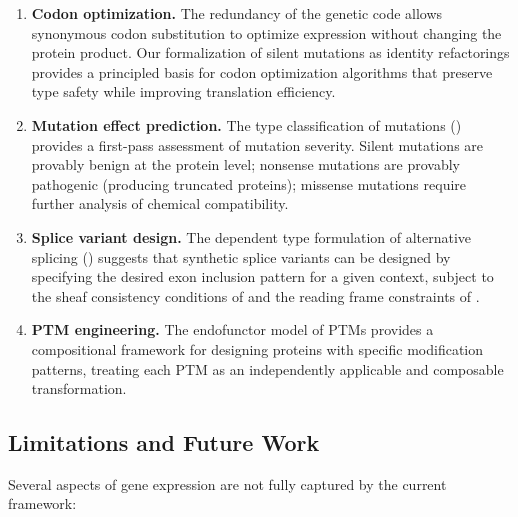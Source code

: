 \documentclass[12pt,a4paper]{article}
\theoremstyle{definition}
\begin{document}
\begin{enumerate}[label=(\alph*)]
  \item \textbf{Codon optimization.} The redundancy of the genetic code allows synonymous codon substitution to optimize expression without changing the protein product. Our formalization of silent mutations as identity refactorings provides a principled basis for codon optimization algorithms that preserve type safety while improving translation efficiency.

  \item \textbf{Mutation effect prediction.} The type classification of mutations () provides a first-pass assessment of mutation severity. Silent mutations are provably benign at the protein level; nonsense mutations are provably pathogenic (producing truncated proteins); missense mutations require further analysis of chemical compatibility.

  \item \textbf{Splice variant design.} The dependent type formulation of alternative splicing () suggests that synthetic splice variants can be designed by specifying the desired exon inclusion pattern for a given context, subject to the sheaf consistency conditions of  and the reading frame constraints of .

  \item \textbf{PTM engineering.} The endofunctor model of PTMs provides a compositional framework for designing proteins with specific modification patterns, treating each PTM as an independently applicable and composable transformation.
\end{enumerate}

\subsection{Limitations and Future Work}

Several aspects of gene expression are not fully captured by the current framework:
\end{document}
